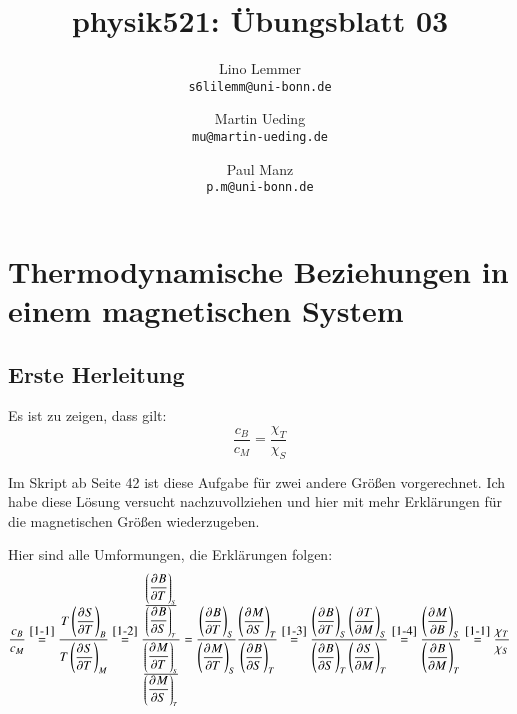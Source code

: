 

\setcounter{section}{0}
\renewcommand\thesection{H\,3.\arabic{section}}
\renewcommand\thesubsection{\thesection.\alph{subsection}}

\title{physik521: Übungsblatt 03}
\author{%
    Lino Lemmer \\ \small{\texttt{s6lilemm@uni-bonn.de}}
    \and
    Martin Ueding \\ \small{\texttt{mu@martin-ueding.de}}
    \and
    Paul Manz \\ \small{\texttt{p.m@uni-bonn.de}}
}


\maketitle

\section{Thermodynamische Beziehungen in einem magnetischen System}

\newcommand\tdpd[3]{\del{\dpd{#1}{#2}}_{#3}}

\subsection{Erste Herleitung}

Es ist zu zeigen, dass gilt:
\[
    \frac{c_B}{c_M} = \frac{\chi_T}{\chi_S}
\]

Im Skript ab Seite 42 ist diese Aufgabe für zwei andere Größen
vorgerechnet. Ich habe diese Lösung versucht nachzuvollziehen und hier
mit mehr Erklärungen für die magnetischen Größen wiederzugeben.

Hier sind alle Umformungen, die Erklärungen folgen:
\[
    \frac{c_B}{c_M}
    \overset{\ref{1-1}}=
    \frac{T \tdpd S T B}{T \tdpd S T M}
    \overset{\ref{1-2}}=
    \frac{ \frac{\tdpd BTS}{\tdpd BST} }{ \frac{\tdpd MTS}{\tdpd MST} }
    =
    \frac{\tdpd BTS}{\tdpd MTS} \frac{\tdpd MST}{\tdpd BST}
    \overset{\ref{1-3}}=
    \frac{\tdpd BTS \tdpd TMS}{\tdpd BST \tdpd SMT}
    \overset{\ref{1-4}}=
    \frac{\tdpd MBS}{\tdpd BMT}
    \overset{\ref{1-1}}=
    \frac{\chi_T}{\chi_S}
\]

